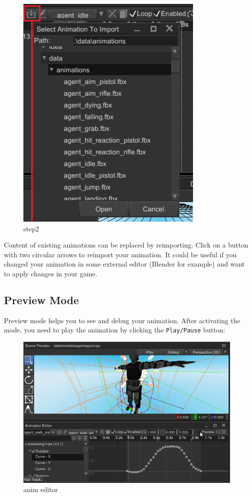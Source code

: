 \documentclass[
]{book}
\theoremstyle{definition}
\theoremstyle{definition}
\theoremstyle{definition}
\theoremstyle{definition}
\theoremstyle{remark}
\begin{document}
\begin{figure}
\centering
\includegraphics{images/animation/ae_import_select_animation.png}
\caption{step2}
\end{figure}

Content of existing animations can be replaced by reimporting. Click on a button with two circular arrows to reimport your animation. It could be useful if you changed your animation in some external editor (Blender for example) and want to apply changes in your game.

\subsection{Preview Mode}\label{preview-mode}

Preview mode helps you to see and debug your animation. After activating the mode, you need to play the animation by clicking the \texttt{Play/Pause} button:

\begin{figure}
\centering
\includegraphics{images/animation/anim_editor.gif}
\caption{anim editor}
\end{figure}
\end{document}
